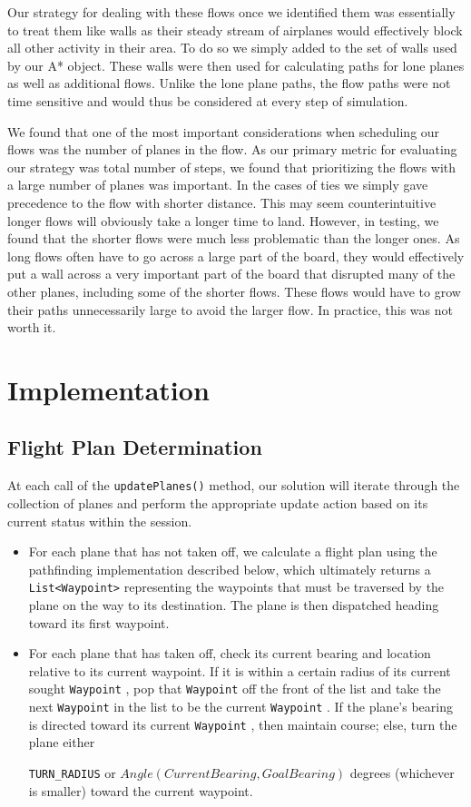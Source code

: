 \documentclass[10pt]{article}
\newcommand{\ms}[1] {
  \texttt{#1}
}
\begin{document}
Our strategy for dealing with these flows once we identified them was essentially to treat them like walls as their steady stream of airplanes would effectively block all other activity in their area. To do so we simply added to the set of walls used by our A* object. These walls were then used for calculating paths for lone planes as well as additional flows. Unlike the lone plane paths, the flow paths were not time sensitive and would thus be considered at every step of simulation.

We found that one of the most important considerations when scheduling our flows was the number of planes in the flow. As our primary metric for evaluating our strategy was total number of steps, we found that prioritizing the flows with a large number of planes was important. In the cases of ties we simply gave precedence to the flow with shorter distance. This may seem counterintuitive longer flows will obviously take a longer time to land. However, in testing, we found that the shorter flows were much less problematic than the longer ones. As long flows often have to go across a large part of the board, they would effectively put a wall across a very important part of the board that disrupted many of the other planes, including some of the shorter flows. These flows would have to grow their paths unnecessarily large to avoid the larger flow. In practice, this was not worth it.

\newpage
\section{Implementation}

\subsection{Flight Plan Determination}
At each call of the \ms{updatePlanes()} method, our solution will iterate through the collection of 
planes and perform the appropriate update action based on its current status within the session.
\begin{itemize}
  \item For each plane that has not taken off, we calculate a flight plan using the pathfinding
    implementation described below, which ultimately returns a \ms{List<Waypoint>} representing the waypoints that must
    be traversed by the plane on the way to its destination. The plane is then dispatched heading toward
    its first waypoint.
  \item For each plane that has taken off, check its current bearing and location relative to its
    current waypoint. If it is within a certain radius of its current sought \ms{Waypoint}, pop that \ms{Waypoint} off
    the front of the list and take the next \ms{Waypoint} in the list to be the current \ms{Waypoint}. If the
    plane's bearing is directed toward its current \ms{Waypoint}, then maintain course; else, turn the plane either
    \ms{TURN\_RADIUS} or $Angle(Current Bearing, Goal Bearing)$ degrees (whichever is smaller) toward the current
    waypoint. 
\end{itemize}
\end{document}
